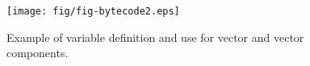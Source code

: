 
\begin{figure}[!ht]
\begin{center}
\texttt{[image: fig/fig-bytecode2.eps]}
\caption{Example of variable definition and use for vector and
vector components.}\label{fig-bytecode2}
\end{center}
\end{figure}


\begin{comment}
01 public class VetClone {
02     static Integer cp[];
03
04     Integer[] copy( Integer[] or )
05     {
06         if ( or != null ) {
07             cp = new Integer[or.length];
08             for( int i = 0; i < or.length; i++ )
09             {
10                 cp[i] = new Integer( or[i].intValue() );
11                 print( cp[i] );
12             }
13         }
14         return cp;
15     }
16     public void print( Object obj )
17     {
18         System.out.print( obj.toString() );
19     }
20 }

0:    aload_1
1:    ifnull        #53
4:    aload_1
5:    arraylength
6:    anewarray     <java.lang.Integer>
9:    putstatic     VetClone.cp
12:   iconst_0
13:   istore_2
14:   goto          #47
17:   getstatic     VetClone.cp
20:   iload_2
21:   new           <java.lang.Integer>
24:   dup
25:   aload_1
26:   iload_2
27:   aaload
28:   invokevirtual java.lang.Integer.intValue
31:   invokespecial java.lang.Integer.<init>
34:   aastore
35:   aload_0
36:   getstatic     VetClone.cp
39:   iload_2
40:   aaload
41:   invokevirtual VetClone.print
44:   iinc          %
47:   iload_2
48:   aload_1
49:   arraylength
50:   if_icmplt     #17
53:   getstatic     VetClone.cp
56:   areturn
\end{comment}
